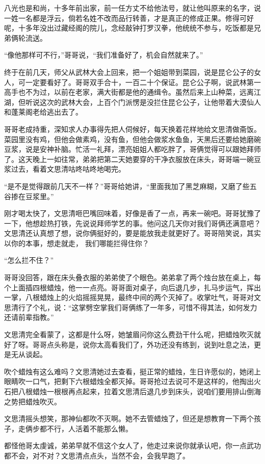 八光也是和尚，十多年前出家，前一任方丈不给他法号，就让他叫原来的名字，说一姓一名都是浮云，倘若名姓不改而品行转善，才是真正的修成正果。修得可好呢，十多年没出过藏经阁的院儿，念经敲钟打罗汉拳，他统统不参与，吃饭都是兄弟俩轮流送。

“像他那样可不行，”哥哥说，“我们准备好了，机会自然就来了。”

终于在前几天，师父从武林大会上回来，把一个姐姐带到菜园，说是昆仑公子的女人，可一定要看好了。哥哥双手合十，一百二十个保证。昆仑公子啊，说武林第一高手也不为过，以前在老家，满大街都是他的通缉令。虽然后来上山种菜，远离江湖，但听说这次的武林大会，上百个门派愣是没拦住昆仑公子，让他带着大漠仙人和蓬莱阁老给逃出去了。

哥哥老成持重，深知求人办事得先把人伺候好，每天换着花样地给文思清做斋饭。菜园里没有鸡，但他会做素鸡，没有鱼，但他会做浆水鱼鱼，天黑后还要给她磨碗豆浆，说是安神补脑。忙活一礼拜，漂亮姐姐人都吃胖了，哥俩觉得可以跟她拜师了。这天晚上一如往常，弟弟把第二天她要穿的干净衣服放在床头，哥哥端一碗豆浆过去，看着文思清咕咚咕咚地喝完。

“是不是觉得跟前几天不一样？”哥哥给她讲，“里面我加了黑芝麻糊，又磨了些五谷掺在豆浆里。”

刚才喝太快了，文思清咂巴嘴回味着，好像是香了一点，再来一碗吧。哥哥犹豫了一下，他想趁热打铁，先说说拜师学艺的事。他问这几天你对我们哥俩还满意吧？文思清还认真想了想，说你俩挺好的，要是能放我走就更好了。哥哥陪笑说，其实以你的本事，想走就走，
我们哪能拦得住你？

“怎么拦不住？”

哥哥没回答，跟在床头叠衣服的弟弟使了个眼色。弟弟拿了两个烛台放在桌上，每个上面插四根蜡烛，他一一点亮。哥哥面对桌子，向后退几步，扎马步运气，挥出一掌，八根蜡烛上的火焰摇摇晃晃，最终中间的两个灭掉了。收掌吐气，哥哥对文思清行了个礼，说：“这掌劈空掌我们哥俩练了一年多，可惜不得其法，如何发力还请前辈指教。”

文思清完全看蒙了，这都是什么呀，她皱眉问你这么费劲干什么呢，把蜡烛吹灭就好了呀。哥哥点头称是，说你太高看我们了，外功还没有练到，说到吐息之法，更是无从谈起。

吹个蜡烛有这么难吗？文思清她过去查看，挺正常的蜡烛，生日许愿似的，她闭上眼睛吹一口气，把剩下六根蜡烛全都灭掉。哥哥抢过去说可不是这样的，他掏出火石把八根蜡烛一根根再点起来，拉着文思清后退几步到床头，说咱们要用排山倒海之势把蜡烛吹灭。

文思清摇头想笑，那神仙都吹不灭啊。她不去管蜡烛了，但还是想教育一下两个孩子，走俩步都不行，人活着不能那么懒。

都怪他哥太虔诚，弟弟早就不信这个女人了，他走过来说你就承认吧，你一点武功都不会，对不对？文思清点点头，当然不会，会我早跑了。

